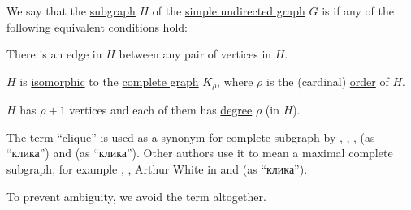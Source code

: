 \begin{definition}\label{def:complete_subgraph}\mimprovised
  We say that the \hyperref[def:undirected_graph/subgraph]{subgraph} \( H \) of the \hyperref[def:undirected_graph]{simple undirected graph} \( G \) is  if any of the following equivalent conditions hold:
  \begin{thmenum}
     There is an edge in \( H \) between any pair of vertices in \( H \).

     \( H \) is \hyperref[def:undirected_graph/homomorphism]{isomorphic} to the \hyperref[def:complete_graph]{complete graph} \( K_\rho \), where \( \rho \) is the (cardinal) \hyperref[def:graph_cardinality/order]{order} of \( H \).

     \( H \) has \( \rho + 1 \) vertices and each of them has \hyperref[def:graph_cardinality/undirected_degree]{degree} \( \rho \) (in \( H \)).
  \end{thmenum}
\end{definition}
\begin{comments}
  \item The term \enquote{clique} is used as a synonym for complete subgraph by , , ,  (as \enquote{клика}) and  (as \enquote{клика}). Other authors use it to mean a maximal complete subgraph, for example , , Arthur White in \cite[596]{Rosen1999DiscreteHandbook} and  (as \enquote{клика}).

  To prevent ambiguity, we avoid the term altogether.
\end{comments}
